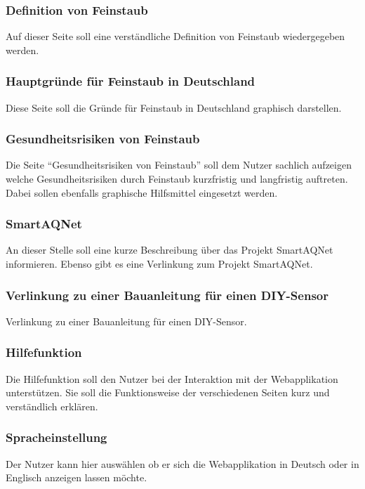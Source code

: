 \subsubsection{Definition von Feinstaub}
Auf dieser Seite soll eine verständliche Definition von \gls{Feinstaub} wiedergegeben werden.


\subsubsection{Hauptgründe für Feinstaub in Deutschland}
Diese Seite soll die Gründe für \gls{Feinstaub} in Deutschland graphisch darstellen.


\subsubsection{Gesundheitsrisiken von Feinstaub}
Die Seite \enquote{Gesundheitsrisiken von \gls{Feinstaub}} soll dem Nutzer sachlich aufzeigen welche Gesundheitsrisiken durch \gls{Feinstaub} kurzfristig und langfristig auftreten. 
Dabei sollen ebenfalls graphische Hilfsmittel eingesetzt werden.

\subsubsection{SmartAQNet}
An dieser Stelle soll eine kurze Beschreibung über das Projekt \gls{SmartAQNet} informieren. 
Ebenso gibt es eine Verlinkung zum Projekt \gls{SmartAQNet}.

\subsubsection{Verlinkung zu einer Bauanleitung für einen DIY-Sensor}
Verlinkung zu einer Bauanleitung für einen \gls{DIY}-\gls{Sensor}.

\subsubsection{Hilfefunktion}
Die Hilfefunktion soll den Nutzer bei der Interaktion mit der Webapplikation unterstützen. Sie soll die Funktionsweise der verschiedenen Seiten kurz und verständlich erklären.

\subsubsection{Spracheinstellung}
Der Nutzer kann hier auswählen ob er sich die Webapplikation in Deutsch oder in Englisch anzeigen lassen möchte.

